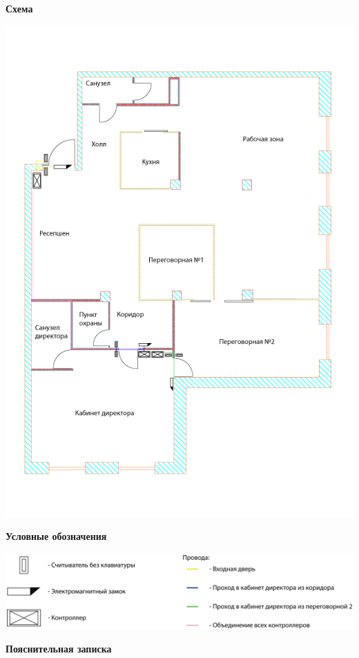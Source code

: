 \documentclass[a4paper,14pt]{extarticle}
\begin{document}
    \begin{center}
        \textbf{Схема}
    \end{center}
    \vspace{-6ex}
    \begin{center}
        \includegraphics[scale=0.65]{pics/SCUD.png}
    \end{center}
    \textbf{Условные обозначения}
    \begin{center}
        \includegraphics[scale=0.65, angle=90]{pics/SCUD(mark).png}
    \end{center}
    \textbf{Пояснительная записка}
\end{document}
